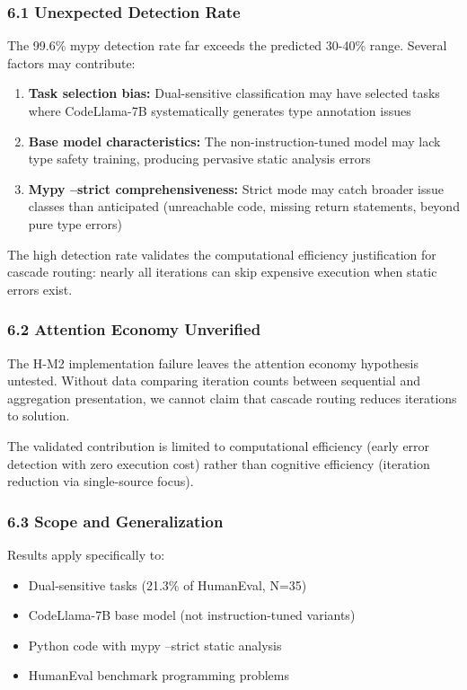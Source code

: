 
\subsubsection{6.1 Unexpected Detection Rate}

The 99.6\% mypy detection rate far exceeds the predicted 30-40\% range. Several factors may contribute:

\begin{enumerate}
\item \textbf{Task selection bias:} Dual-sensitive classification may have selected tasks where CodeLlama-7B systematically generates type annotation issues
\item \textbf{Base model characteristics:} The non-instruction-tuned model may lack type safety training, producing pervasive static analysis errors
\item \textbf{Mypy --strict comprehensiveness:} Strict mode may catch broader issue classes than anticipated (unreachable code, missing return statements, beyond pure type errors)
\end{enumerate}

The high detection rate validates the computational efficiency justification for cascade routing: nearly all iterations can skip expensive execution when static errors exist.

\subsubsection{6.2 Attention Economy Unverified}

The H-M2 implementation failure leaves the attention economy hypothesis untested. Without data comparing iteration counts between sequential and aggregation presentation, we cannot claim that cascade routing reduces iterations to solution.

The validated contribution is limited to computational efficiency (early error detection with zero execution cost) rather than cognitive efficiency (iteration reduction via single-source focus).

\subsubsection{6.3 Scope and Generalization}

Results apply specifically to:
\begin{itemize}
\item Dual-sensitive tasks (21.3\% of HumanEval, N=35)
\item CodeLlama-7B base model (not instruction-tuned variants)
\item Python code with mypy --strict static analysis
\item HumanEval benchmark programming problems
\end{itemize}

